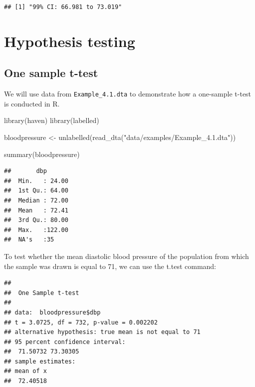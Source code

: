 \documentclass[
]{memoir}
\newenvironment{Shaded}{\begin{snugshade}}{\end{snugshade}}
\newcommand{\AttributeTok}[1]{\textcolor[rgb]{0.77,0.63,0.00}{#1}}
\newcommand{\DecValTok}[1]{\textcolor[rgb]{0.00,0.00,0.81}{#1}}
\newcommand{\FunctionTok}[1]{\textcolor[rgb]{0.00,0.00,0.00}{#1}}
\newcommand{\NormalTok}[1]{#1}
\newcommand{\OtherTok}[1]{\textcolor[rgb]{0.56,0.35,0.01}{#1}}
\newcommand{\SpecialCharTok}[1]{\textcolor[rgb]{0.00,0.00,0.00}{#1}}
\newcommand{\StringTok}[1]{\textcolor[rgb]{0.31,0.60,0.02}{#1}}
\begin{document}
\begin{verbatim}
## [1] "99% CI: 66.981 to 73.019"
\end{verbatim}

\hypertarget{hypothesis-testing}{%
\chapter{Hypothesis testing}\label{hypothesis-testing}}

\hypertarget{one-sample-t-test}{%
\section{One sample t-test}\label{one-sample-t-test}}

We will use data from \texttt{Example\_4.1.dta} to demonstrate how a one-sample t-test is conducted in R.

\begin{Shaded}
\begin{Highlighting}[]
\FunctionTok{library}\NormalTok{(haven)}
\FunctionTok{library}\NormalTok{(labelled)}

\NormalTok{bloodpressure }\OtherTok{\textless{}{-}} \FunctionTok{unlabelled}\NormalTok{(}\FunctionTok{read\_dta}\NormalTok{(}\StringTok{"data/examples/Example\_4.1.dta"}\NormalTok{))}

\FunctionTok{summary}\NormalTok{(bloodpressure)}
\end{Highlighting}
\end{Shaded}

\begin{verbatim}
##       dbp        
##  Min.   : 24.00  
##  1st Qu.: 64.00  
##  Median : 72.00  
##  Mean   : 72.41  
##  3rd Qu.: 80.00  
##  Max.   :122.00  
##  NA's   :35
\end{verbatim}

To test whether the mean diastolic blood pressure of the population from which the sample was drawn is equal to 71, we can use the t.test command:

\begin{Shaded}
\end{Shaded}

\begin{verbatim}
## 
##  One Sample t-test
## 
## data:  bloodpressure$dbp
## t = 3.0725, df = 732, p-value = 0.002202
## alternative hypothesis: true mean is not equal to 71
## 95 percent confidence interval:
##  71.50732 73.30305
## sample estimates:
## mean of x 
##  72.40518
\end{verbatim}
\end{document}

